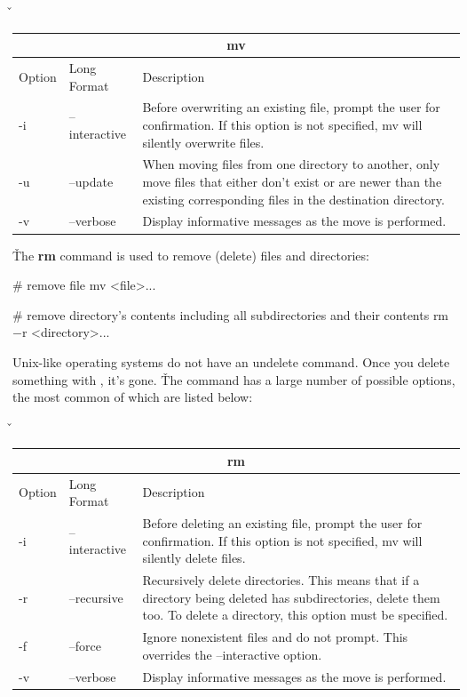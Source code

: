 \v

\begin{tabular}{ |p{1cm}|p{3cm}||p{10.6cm}| }
\hline
\multicolumn{3}{|c|}{mv} \\
\hline
Option& Long Format& Description\\
\hline
-i & --interactive & Before overwriting an existing file, prompt the user for confirmation. If this option is not specified, mv will silently overwrite files.\\
-u & --update & When moving files from one directory to another, only move files that either don't exist or are newer than the existing corresponding files in the destination directory.\\
-v & --verbose & Display informative messages as the move is performed.\\
\hline
\end{tabular}

\v

The \textbf{rm} command is used to remove (delete) files and directories:
\begin{bash}
# remove file
mv <file>...
\end{bash}

\begin{bash}
# remove directory's contents including all subdirectories and their contents
rm $-$r <directory>...
\end{bash}

Unix-like operating systems do not have an undelete command. Once you delete something with , it's gone. \v

The  command has a large number of possible options, the most common of which are listed below:

\v

\begin{tabular}{ |p{1cm}|p{3cm}||p{10.6cm}| }
\hline
\multicolumn{3}{|c|}{rm} \\
\hline
Option& Long Format& Description\\
\hline
-i & --interactive & Before deleting an existing file, prompt the user for confirmation. If this option is not specified, mv will silently delete files.\\
-r & --recursive & Recursively delete directories. This means that if a directory being deleted has subdirectories, delete them too. To delete a directory, this option must be specified.\\
-f & --force & Ignore nonexistent files and do not prompt. This overrides the --interactive option.\\
-v & --verbose & Display informative messages as the move is performed.\\
\hline
\end{tabular}

